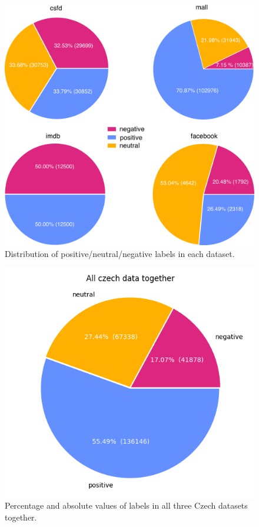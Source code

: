 \begin{figure}[!h]
\centering
\includegraphics[width=1\columnwidth]{../img/dist_all.png}
\protect\caption{Distribution of positive/neutral/negative labels in each dataset.}
\label{pic:dist}
\end{figure}

\begin{figure}[!h]
\centering
\includegraphics[width=0.7\columnwidth]{../img/all.png}
\protect\caption{Percentage and absolute values of labels in all three Czech datasets together.}
\label{pic:dist_all}
\end{figure}


